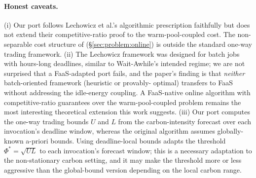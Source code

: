\paragraph{Honest caveats.} (i) Our port follows Lechowicz et al.'s
algorithmic prescription faithfully but does not extend their
competitive-ratio proof to the warm-pool-coupled cost. The non-separable
cost structure of \GreenFaaS{} (\S\ref{sec:problem:online}) is
outside the standard one-way trading framework. (ii) The Lechowicz
framework was designed for batch jobs with hours-long deadlines,
similar to Wait-Awhile's intended regime; we are not surprised that a
FaaS-adapted port fails, and the paper's finding is that
\emph{neither} batch-oriented framework (heuristic or provably-
optimal) transfers to FaaS without addressing the idle-energy
coupling. A FaaS-native online algorithm with competitive-ratio
guarantees over the warm-pool-coupled problem remains the most
interesting theoretical extension this work suggests.
(iii) Our port computes the one-way trading bounds $U$ and $L$ from
the carbon-intensity forecast over each invocation's deadline window,
whereas the original algorithm assumes globally-known a-priori
bounds. Using deadline-local bounds adapts the threshold
$\Phi^* = \sqrt{UL}$ to each invocation's forecast window; this is a
necessary adaptation to the non-stationary carbon setting, and it may
make the threshold more or less aggressive than the global-bound
version depending on the local carbon range.
